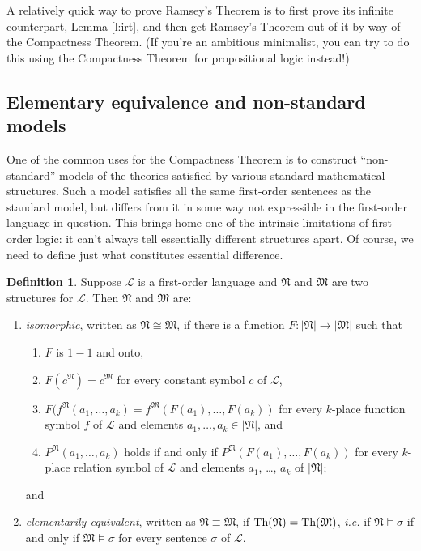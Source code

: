 \documentclass[12pt]{amsbook}
\theoremstyle{plain}
\theoremstyle{definition}
\newtheorem{defn}{Definition}[chapter]
\theoremstyle{remark}
\begin{document}
A relatively quick way to prove Ramsey's Theorem is to first prove its infinite counterpart,  Lemma \ref{l:irt},  and then get Ramsey's Theorem out of it by way of the Compactness Theorem.  (If you're an ambitious minimalist,  you can try to do this using the Compactness Theorem for propositional logic instead!)


\subsection*{Elementary equivalence and non-standard models}

One of the common uses for the Compactness Theorem is to construct ``non-standard'' models of the theories satisfied by various standard mathematical structures.  Such a model satisfies all the same first-order sentences as the standard model,  but differs from it in some way not expressible in the first-order language in question.  This brings home one of the intrinsic limitations of first-order logic:  it can't always tell essentially different structures apart.  Of course,  we need to define just what constitutes essential difference.

\begin{defn}
Suppose $\mathcal{L}$ is a first-order language and $\mathfrak{N}$ and $\mathfrak{M}$ are two structures for $\mathcal{L}$.  Then $\mathfrak{N}$ and $\mathfrak{M}$ are:
\begin{enumerate}
\item {\em isomorphic\/},  written as $\mathfrak{N} \cong \mathfrak{M}$,  if there is a function $F \colon |\mathfrak{N}| \to |\mathfrak{M}|$ such that
\begin{enumerate}
\item $F$ is $1-1$ and onto,
\item $F(c^{\mathfrak{N}}) = c^{\mathfrak{M}}$ for every constant symbol $c$ of $\mathcal{L}$,
\item $F(f^{\mathfrak{N}}(a_1, \dots, a_k) = f^{\mathfrak{M}}(F(a_1), \dots, F(a_k))$ for every $k$-place function symbol $f$ of $\mathcal{L}$ and elements $a_1, \dots, a_k \in |\mathfrak{N}|$,  and
\item $P^{\mathfrak{N}}(a_1, \dots, a_k)$ holds if and only if $P^{\mathfrak{N}}(F(a_1), \dots, F(a_k))$ for every $k$-place relation symbol of $\mathcal{L}$ and elements $a_1$, \dots, $a_k$ of $|\mathfrak{N}|$;
\end{enumerate}
and
\item {\em elementarily equivalent\/},   written as $\mathfrak{N} \equiv \mathfrak{M}$,  if $\text{\rm Th}(\mathfrak{N}) = \text{\rm Th}(\mathfrak{M})$,  {\em i.e.\/} if $\mathfrak{N} \models \sigma$ if and only if $\mathfrak{M} \models \sigma$ for every sentence $\sigma$ of $\mathcal{L}$.
\end{enumerate}
\end{defn}
\end{document}
